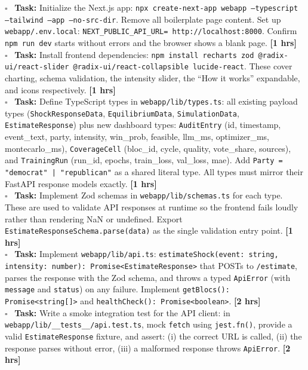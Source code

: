\documentclass[11pt]{article}
\newcommand{\hrs}[1]{\textbf{[#1 hrs]}}
\newcommand{\task}[2]{%
  \noindent\textbf{Task:} #1 \hfill \hrs{#2}\\}
\newcommand{\done}{\textcolor{sectionblue}{$\square$}\ }
\begin{document}
\begin{taskbox}
\done \task{Initialize the Next.js app: \texttt{npx create-next-app webapp
  --typescript --tailwind --app --no-src-dir}. Remove all boilerplate page
  content. Set up \texttt{webapp/.env.local}: \texttt{NEXT\_PUBLIC\_API\_URL=
  http://localhost:8000}. Confirm \texttt{npm run dev} starts without errors
  and the browser shows a blank page.}{1}

\done \task{Install frontend dependencies: \texttt{npm install recharts zod
  @radix-ui/react-slider @radix-ui/react-collapsible lucide-react}.
  These cover charting, schema validation, the intensity slider, the
  ``How it works'' expandable, and icons respectively.}{1}

\done \task{Define TypeScript types in \texttt{webapp/lib/types.ts}: all existing
  payload types (\texttt{ShockResponseData}, \texttt{EquilibriumData},
  \texttt{SimulationData}, \texttt{EstimateResponse}) plus new dashboard
  types: \texttt{AuditEntry} (id, timestamp, event\_text, party, intensity,
  win\_prob, feasible, llm\_ms, optimizer\_ms, montecarlo\_ms),
  \texttt{CoverageCell} (bloc\_id, cycle, quality, vote\_share, sources),
  and \texttt{TrainingRun} (run\_id, epochs, train\_loss, val\_loss, mae).
  Add \texttt{Party = "democrat" | "republican"} as a shared literal type.
  All types must mirror their FastAPI response models exactly.}{1}

\done \task{Implement Zod schemas in \texttt{webapp/lib/schemas.ts} for each
  type. These are used to validate API responses at runtime so the frontend
  fails loudly rather than rendering NaN or undefined. Export
  \texttt{EstimateResponseSchema.parse(data)} as the single validation
  entry point.}{1}

\done \task{Implement \texttt{webapp/lib/api.ts}: \texttt{estimateShock(event:
  string, intensity: number): Promise<EstimateResponse>} that POSTs to
  \texttt{/estimate}, parses the response with the Zod schema, and throws
  a typed \texttt{ApiError} (with \texttt{message} and \texttt{status})
  on any failure. Implement \texttt{getBlocs(): Promise<string[]>} and
  \texttt{healthCheck(): Promise<boolean>}.}{2}

\done \task{Write a smoke integration test for the API client: in
  \texttt{webapp/lib/\_\_tests\_\_/api.test.ts}, mock \texttt{fetch} using
  \texttt{jest.fn()}, provide a valid \texttt{EstimateResponse} fixture,
  and assert: (i) the correct URL is called, (ii) the response parses
  without error, (iii) a malformed response throws \texttt{ApiError}.}{2}
\end{taskbox}
\end{document}
